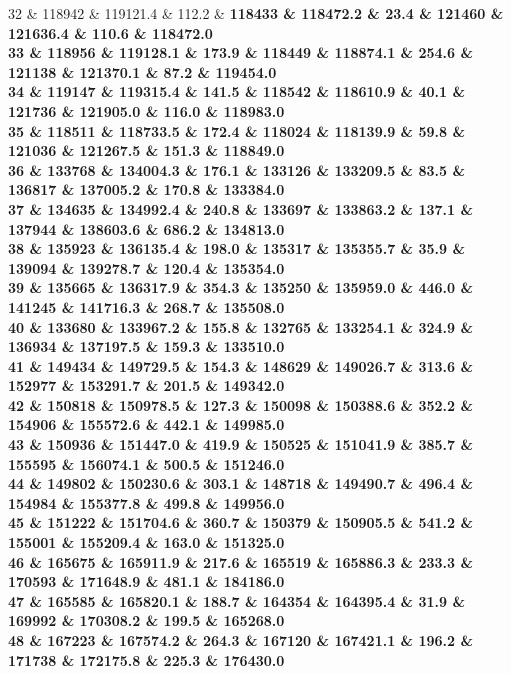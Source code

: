 32 \& 118942 \& 119121.4 \& 112.2 \& \bfseries 118433 \& 118472.2 \& 23.4 \& 121460 \& 121636.4 \& 110.6 \& 118472.0 \\
33 \& 118956 \& 119128.1 \& 173.9 \& \bfseries 118449 \& 118874.1 \& 254.6 \& 121138 \& 121370.1 \& 87.2 \& 119454.0 \\
34 \& 119147 \& 119315.4 \& 141.5 \& \bfseries 118542 \& 118610.9 \& 40.1 \& 121736 \& 121905.0 \& 116.0 \& 118983.0 \\
35 \& 118511 \& 118733.5 \& 172.4 \& \bfseries 118024 \& 118139.9 \& 59.8 \& 121036 \& 121267.5 \& 151.3 \& 118849.0 \\
36 \& 133768 \& 134004.3 \& 176.1 \& \bfseries 133126 \& 133209.5 \& 83.5 \& 136817 \& 137005.2 \& 170.8 \& 133384.0 \\
37 \& 134635 \& 134992.4 \& 240.8 \& \bfseries 133697 \& 133863.2 \& 137.1 \& 137944 \& 138603.6 \& 686.2 \& 134813.0 \\
38 \& 135923 \& 136135.4 \& 198.0 \& \bfseries 135317 \& 135355.7 \& 35.9 \& 139094 \& 139278.7 \& 120.4 \& 135354.0 \\
39 \& 135665 \& 136317.9 \& 354.3 \& \bfseries 135250 \& 135959.0 \& 446.0 \& 141245 \& 141716.3 \& 268.7 \& 135508.0 \\
40 \& 133680 \& 133967.2 \& 155.8 \& \bfseries 132765 \& 133254.1 \& 324.9 \& 136934 \& 137197.5 \& 159.3 \& 133510.0 \\
41 \& 149434 \& 149729.5 \& 154.3 \& \bfseries 148629 \& 149026.7 \& 313.6 \& 152977 \& 153291.7 \& 201.5 \& 149342.0 \\
42 \& 150818 \& 150978.5 \& 127.3 \& 150098 \& 150388.6 \& 352.2 \& 154906 \& 155572.6 \& 442.1 \& \bfseries 149985.0 \\
43 \& 150936 \& 151447.0 \& 419.9 \& \bfseries 150525 \& 151041.9 \& 385.7 \& 155595 \& 156074.1 \& 500.5 \& 151246.0 \\
44 \& 149802 \& 150230.6 \& 303.1 \& \bfseries 148718 \& 149490.7 \& 496.4 \& 154984 \& 155377.8 \& 499.8 \& 149956.0 \\
45 \& 151222 \& 151704.6 \& 360.7 \& \bfseries 150379 \& 150905.5 \& 541.2 \& 155001 \& 155209.4 \& 163.0 \& 151325.0 \\
46 \& 165675 \& 165911.9 \& 217.6 \& \bfseries 165519 \& 165886.3 \& 233.3 \& 170593 \& 171648.9 \& 481.1 \& 184186.0 \\
47 \& 165585 \& 165820.1 \& 188.7 \& \bfseries 164354 \& 164395.4 \& 31.9 \& 169992 \& 170308.2 \& 199.5 \& 165268.0 \\
48 \& 167223 \& 167574.2 \& 264.3 \& \bfseries 167120 \& 167421.1 \& 196.2 \& 171738 \& 172175.8 \& 225.3 \& 176430.0 \\
